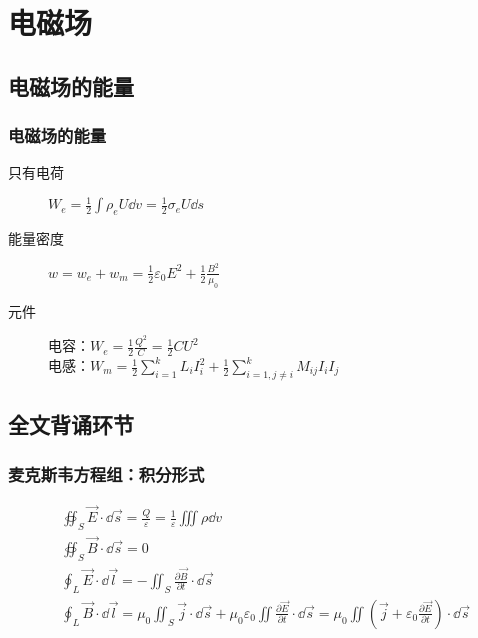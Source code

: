 \documentclass{beamer}
\begin{document}
\section{电磁场}

\subsection{电磁场的能量}

\begin{frame}[c]
    \frametitle{电磁场的能量}
    
    \begin{description}
        \item[只有电荷] $W_e=\frac{1}{2}\int\rho_eU\dd v=\frac{1}{2}\sigma_eU\dd s$
        \item[能量密度] $w=w_e+w_m=\frac{1}{2}\varepsilon_0 E^2+\frac{1}{2}\frac{B^2}{\mu_0}$
        \item[元件] 电容：$W_e=\frac{1}{2}\frac{Q^2}{C}=\frac{1}{2}CU^2$\\电感：$W_m=\frac{1}{2}\sum^k_{i=1}L_iI_i^2+\frac{1}{2}\sum^k_{i=1, j\neq i}M_{ij}I_iI_j$
    \end{description}
    
\end{frame}

\subsection{全文背诵环节}

\begin{frame}[c]
    \frametitle{麦克斯韦方程组：积分形式}
    
    $$\begin{aligned}
             & \oiint_S\vec{E}\cdot\dd\vec{s}=\frac{Q}{\varepsilon}=\frac{1}{\varepsilon}\iiint\rho\dd v                                                                                                                                    \\
             & \oiint_S\vec{B}\cdot\dd\vec{s}=0                                                                                                                                                                                             \\
             & \oint_L\vec{E}\cdot\dd\vec{l}=-\iint_S\frac{\partial\vec{B}}{\partial t}\cdot\dd\vec{s}                                                                                                                                      \\
             & \oint_L\vec{B}\cdot\dd\vec{l}=\mu_0\iint_S\vec{j}\cdot\dd\vec{s}+\mu_0\varepsilon_0\iint\frac{\partial\vec{E}}{\partial t}\cdot\dd\vec{s}=\mu_0\iint(\vec{j}+\varepsilon_0\frac{\partial\vec{E}}{\partial t})\cdot\dd\vec{s}
        \end{aligned}$$
    
\end{frame}
\end{document}
